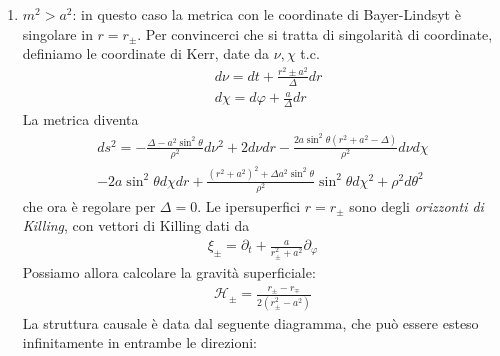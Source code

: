 \documentclass{report}
\begin{document}
\begin{enumerate}
    In particolare, se la singolarità è un anello, io posso passarci in mezzo: non c'è nessuna ragione per cui debba valere \(r \geq 0\), e lo spaziotempo può essere continuato analiticamente attraverso il disco, a un altra regione asindoticamente piatta con \(r < 0\). 

    Studiamo ora la struttura causale. Nota che siccome il sistema ha simmetria assiale, avremmo bisogno di un diagramma 3D per visualizzare nel completo la struttura causale. D'altra parte, le sottovarietà \(\theta =0, \pi/2\) sono varietà \emph{total-geodetiche}: questo vuol dire che ogni geodetica della sottovarietà è anche una geodetica della varietà completa. Possiamo allora disegnare la struttura causale delle sottovarietà. Otteniamo: 

    Vediamo in particolare che oltre a contenere una singolarità nuda, lo spaziotempo \emph{non è fisico}. Infatti, vicino alla ring-singularity, il vettore di killing \(\partial_\varphi\) ha norma negativa, vicino alla ring-singularity. (questo viola l'ipotesi di assisimmetria, perché avevamo assunto nella definizione che il vettore di Killing fosse di tipo spazio. Questo è fondamentale perché se no avrei delle orbite chiuse, di un vettore di tipo tempo, che quindi viola la causalità.) 
    
    \item \(m^2 > a^2\): in questo caso la metrica con le coordinate di Bayer-Lindsyt è singolare in \(r = r_\pm\). Per convincerci che si tratta di singolarità di coordinate, definiamo le coordinate di Kerr, date da \(\nu, \chi\) t.c. 
    \begin{align}
        &d\nu = dt + \frac{r^2\pm a^2}{\Delta}dr \\
        &d\chi = d\varphi + \frac{a}{\Delta}dr
    \end{align}
    La metrica diventa 
    \begin{align}
        ds^2 = -\frac{\Delta - a^2\sin^2\theta}{\rho^2}d\nu^2 + 2d\nu dr - \frac{2a\sin^2\theta(r^2+a^2-\Delta)}{\rho^2}d\nu d\chi  \\ - 2a\sin^2\theta d\chi dr + \frac{(r^2+a^2)^2 + \Delta a^2\sin^2\theta}{\rho^2}\sin^2\theta d\chi^2 + \rho^2d\theta^2 
    \end{align}
    che ora è regolare per \(\Delta =0\). Le ipersuperfici \(r = r_\pm\) sono degli \emph{orizzonti di Killing}, con vettori di Killing dati da 
    \begin{align}
        \xi_\pm = \partial_t + \frac{a}{r^2_\pm + a^2}\partial_\varphi
    \end{align}
    Possiamo allora calcolare la gravità superficiale: 
    \begin{align}
        \mathcal{H}_\pm = \frac{r_\pm - r_\mp}{2(r_\pm^2-a^2)}
    \end{align}
    La struttura causale è data dal seguente diagramma, che può essere esteso infinitamente in entrambe le direzioni: 


\end{enumerate}
\end{document}

